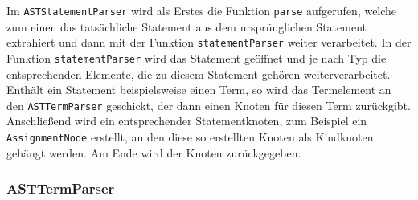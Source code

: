 Im \texttt{ASTStatementParser} wird als Erstes die Funktion \texttt{parse} aufgerufen, welche zum einen das tatsächliche Statement aus dem ursprünglichen Statement extrahiert und dann mit der Funktion \texttt{statementParser} weiter verarbeitet. 
\newline
\newline
In der Funktion \texttt{statementParser} wird das Statement geöffnet und je nach Typ die entsprechenden Elemente, die zu diesem Statement gehören weiterverarbeitet. Enthält ein Statement beispielsweise einen Term, so wird das Termelement an den \texttt{ASTTermParser} geschickt, der dann einen Knoten für diesen Term zurückgibt. Anschließend wird ein entsprechender Statementknoten, zum Beispiel ein \texttt{AssignmentNode} erstellt, an den diese so erstellten Knoten als Kindknoten gehängt werden. 
Am Ende wird der Knoten zurückgegeben.

\subsubsection{ASTTermParser}


